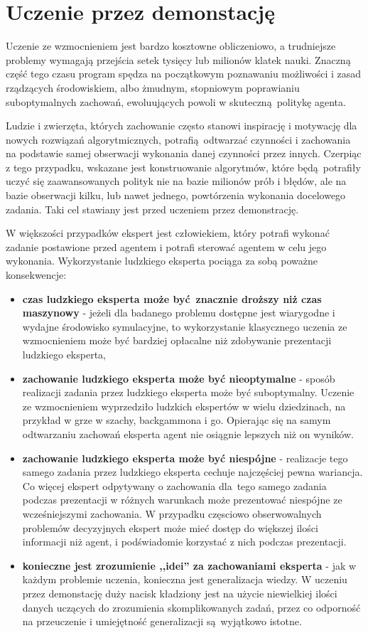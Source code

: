 \section{Uczenie przez demonstację}\label{imitation_learning}
Uczenie ze wzmocnieniem jest bardzo kosztowne obliczeniowo, a trudniejsze problemy wymagają przejścia setek tysięcy lub milionów klatek nauki. Znaczną część tego czasu program spędza na początkowym poznawaniu możliwości i zasad rządzących środowiskiem, albo żmudnym, stopniowym poprawianiu suboptymalnych zachowań, ewoluujących powoli w skuteczną politykę agenta.

Ludzie i zwierzęta, których zachowanie często stanowi inspirację i motywację dla nowych rozwiązań algorytmicznych, potrafią odtwarzać czynności i zachowania na podstawie samej obserwacji wykonania danej czynności przez innych. Czerpiąc z tego przypadku, wskazane jest konstruowanie algorytmów, które będą potrafiły uczyć się zaawansowanych polityk nie na bazie milionów prób i błędów, ale na bazie obserwacji kilku, lub nawet jednego, powtórzenia wykonania docelowego zadania. Taki cel stawiany jest przed uczeniem przez demonstrację.

W większości przypadków ekspert jest człowiekiem, który potrafi wykonać zadanie postawione przed agentem i potrafi sterować agentem w celu jego wykonania. Wykorzystanie ludzkiego eksperta pociąga za sobą poważne konsekwencje:
\begin{itemize}
\item \textbf{czas ludzkiego eksperta może być znacznie droższy niż czas maszynowy} - jeżeli dla badanego problemu dostępne jest wiarygodne i wydajne środowisko symulacyjne, to wykorzystanie klasycznego uczenia ze wzmocnieniem może być bardziej opłacalne niż zdobywanie prezentacji ludzkiego eksperta,
\item \textbf{zachowanie ludzkiego eksperta może być nieoptymalne} - sposób realizacji zadania przez ludzkiego eksperta może być suboptymalny. Uczenie ze wzmocnieniem wyprzedziło ludzkich ekspertów w wielu dziedzinach, na przykład w grze w szachy, backgammona i go. Opierając się na samym odtwarzaniu zachowań eksperta agent nie osiągnie lepszych niż on wyników.
\item \textbf{zachowanie ludzkiego eksperta może być niespójne} - realizacje tego samego zadania przez ludzkiego eksperta cechuje najczęściej pewna wariancja. Co więcej ekspert odpytywany o zachowania dla tego samego zadania podczas prezentacji w różnych warunkach może prezentować niespójne ze wcześniejszymi zachowania. W przypadku częsciowo obserwowalnych problemów decyzyjnych ekspert może mieć dostęp do większej ilości informacji niż agent, i podświadomie korzystać z nich podczas prezentacji.
\item  \textbf{konieczne jest zrozumienie ,,idei'' za zachowaniami eksperta} - jak w każdym problemie uczenia, konieczna jest generalizacja wiedzy. W uczeniu przez demonstację duży nacisk kładziony jest na użycie niewielkiej ilości danych uczących do zrozumienia skomplikowanych zadań, przez co odporność na przeuczenie i umiejętność generalizacji są wyjątkowo istotne.
\end{itemize}   

